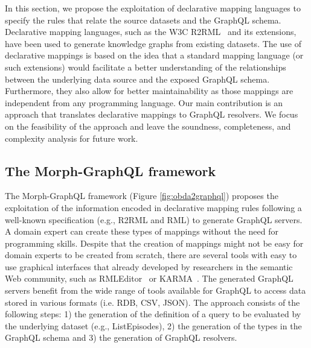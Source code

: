 In this section, we propose the exploitation of declarative mapping languages to specify the rules that relate the source datasets and the GraphQL schema. Declarative mapping languages, such as the W3C R2RML~\citep{R2RML} and its extensions, have been used to generate knowledge graphs from existing datasets. The use of declarative mappings is based on the idea that a standard mapping language (or such extensions) would facilitate a better understanding of the relationships between the underlying data source and the exposed GraphQL schema. Furthermore, they also allow for better maintainability as those mappings are independent from any programming language. Our main contribution is an approach that translates declarative mappings to GraphQL resolvers. We focus on the feasibility of the approach and leave the soundness, completeness, and complexity analysis for future work.

\subsection{The Morph-GraphQL framework}
The Morph-GraphQL framework (Figure \ref{fig:obda2graphql}) proposes the exploitation of the information encoded in declarative mapping rules following a well-known specification (e.g., R2RML and RML) to generate GraphQL servers. A domain expert can create these types of mappings without the need for programming skills. Despite that the creation of mappings might not be easy for domain experts to be created from scratch, there are several tools with easy to use graphical interfaces that already developed by researchers in the semantic Web community, such as RMLEditor~\citep{heyvaert2016rmleditor} or KARMA~\citep{knoblock2015exploiting}. The generated GraphQL servers benefit from the wide range of tools available for GraphQL to access data stored in various formats (i.e. RDB, CSV, JSON). The approach consists of the following steps: 1) the generation of the definition of a query to be evaluated by the underlying dataset (e.g., ListEpisodes), 2) the generation of the types in the GraphQL schema and 3) the generation of GraphQL resolvers. 

